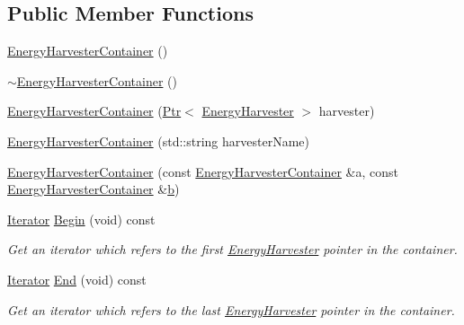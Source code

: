 \subsection*{Public Member Functions}
\begin{DoxyCompactItemize}
\item 
\hyperlink{classns3_1_1EnergyHarvesterContainer_acb445f64ddb3a0ca68448a66d7b72672}{Energy\+Harvester\+Container} ()
\item 
\hyperlink{classns3_1_1EnergyHarvesterContainer_a95e04b8246fe073e76304d598e1e620c}{$\sim$\+Energy\+Harvester\+Container} ()
\item 
\hyperlink{classns3_1_1EnergyHarvesterContainer_ad806c83a2458510c665b299f2694a68d}{Energy\+Harvester\+Container} (\hyperlink{classns3_1_1Ptr}{Ptr}$<$ \hyperlink{classns3_1_1EnergyHarvester}{Energy\+Harvester} $>$ harvester)
\item 
\hyperlink{classns3_1_1EnergyHarvesterContainer_aeb0675712b12a1380261dc450afa46b0}{Energy\+Harvester\+Container} (std\+::string harvester\+Name)
\item 
\hyperlink{classns3_1_1EnergyHarvesterContainer_aa96f0bb985848ddc27c440def6204b78}{Energy\+Harvester\+Container} (const \hyperlink{classns3_1_1EnergyHarvesterContainer}{Energy\+Harvester\+Container} \&a, const \hyperlink{classns3_1_1EnergyHarvesterContainer}{Energy\+Harvester\+Container} \&\hyperlink{lte__pathloss_8m_a21ad0bd836b90d08f4cf640b4c298e7c}{b})
\item 
\hyperlink{classns3_1_1EnergyHarvesterContainer_a0b4cce51dcd5f30832fd89270b3e1b67}{Iterator} \hyperlink{classns3_1_1EnergyHarvesterContainer_a4071b79723146cc48acfa48a432659e5}{Begin} (void) const 
\begin{DoxyCompactList}\small\item\em Get an iterator which refers to the first \hyperlink{classns3_1_1EnergyHarvester}{Energy\+Harvester} pointer in the container. \end{DoxyCompactList}\item 
\hyperlink{classns3_1_1EnergyHarvesterContainer_a0b4cce51dcd5f30832fd89270b3e1b67}{Iterator} \hyperlink{classns3_1_1EnergyHarvesterContainer_a3b2972b556168047b73bda3e70b2e7e6}{End} (void) const 
\begin{DoxyCompactList}\small\item\em Get an iterator which refers to the last \hyperlink{classns3_1_1EnergyHarvester}{Energy\+Harvester} pointer in the container. \end{DoxyCompactList}\item 

\end{DoxyCompactItemize}
